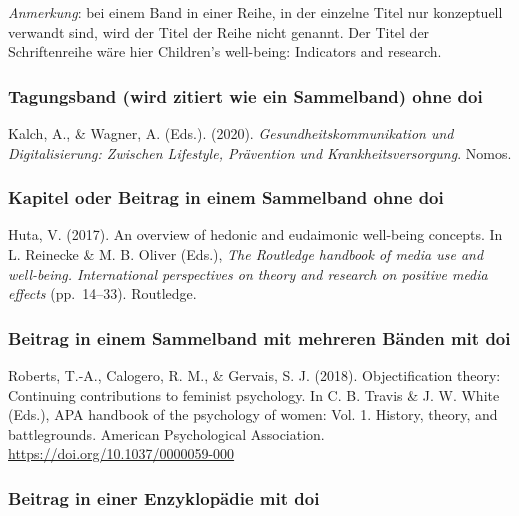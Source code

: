 \documentclass[
  letterpaper,
  DIV=11]{scrreprt}
\begin{document}
\emph{Anmerkung}: bei einem Band in einer Reihe, in der einzelne Titel
nur konzeptuell verwandt sind, wird der Titel der Reihe nicht genannt.
Der Titel der Schriftenreihe wäre hier Children's well-being: Indicators
and research.

\hypertarget{tagungsband-wird-zitiert-wie-ein-sammelband-ohne-doi}{%
\subsubsection{Tagungsband (wird zitiert wie ein Sammelband) \textbar{}
ohne doi}\label{tagungsband-wird-zitiert-wie-ein-sammelband-ohne-doi}}

Kalch, A., \& Wagner, A. (Eds.). (2020). \emph{Gesundheitskommunikation
und Digitalisierung: Zwischen Lifestyle, Prävention und
Krankheitsversorgung}. Nomos.

\hypertarget{kapitel-oder-beitrag-in-einem-sammelband-ohne-doi}{%
\subsubsection{Kapitel oder Beitrag in einem Sammelband \textbar{} ohne
doi}\label{kapitel-oder-beitrag-in-einem-sammelband-ohne-doi}}

Huta, V. (2017). An overview of hedonic and eudaimonic well-being
concepts. In L. Reinecke \& M. B. Oliver (Eds.), \emph{The Routledge
handbook of media use and well-being. International perspectives on
theory and research on positive media effects} (pp.~14--33). Routledge.

\hypertarget{beitrag-in-einem-sammelband-mit-mehreren-buxe4nden-mit-doi}{%
\subsubsection{Beitrag in einem Sammelband mit mehreren Bänden
\textbar{} mit
doi}\label{beitrag-in-einem-sammelband-mit-mehreren-buxe4nden-mit-doi}}

Roberts, T.-A., Calogero, R. M., \& Gervais, S. J. (2018).
Objectification theory: Continuing contributions to feminist psychology.
In C. B. Travis \& J. W. White (Eds.), APA handbook of the psychology of
women: Vol. 1. History, theory, and battlegrounds. American
Psychological Association. \url{https://doi.org/10.1037/0000059-000}

\hypertarget{beitrag-in-einer-enzyklopuxe4die-mit-doi}{%
\subsubsection{Beitrag in einer Enzyklopädie \textbar{} mit
doi}\label{beitrag-in-einer-enzyklopuxe4die-mit-doi}}
\end{document}
